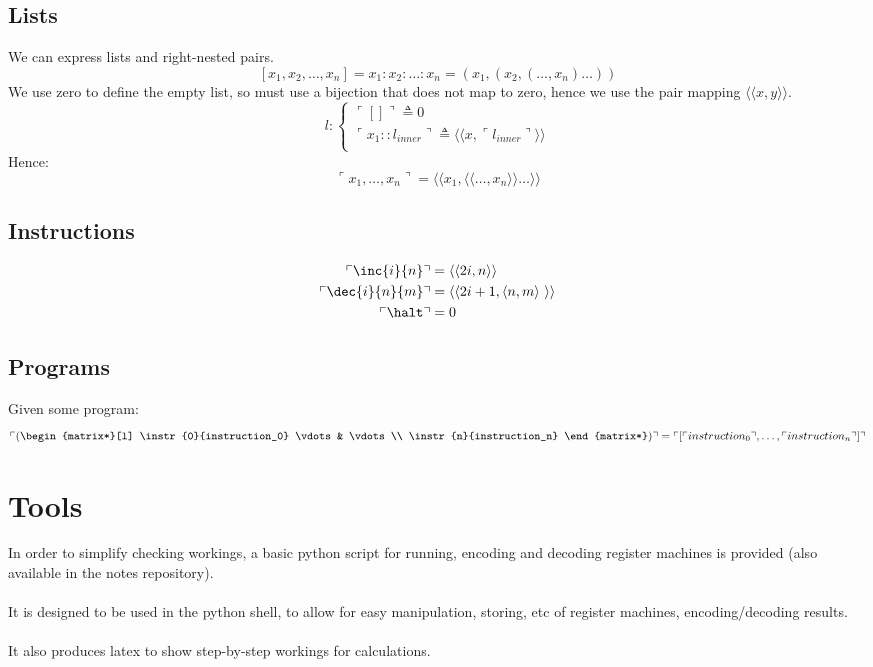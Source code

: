 \subsection{Lists}
We can express lists and right-nested pairs.
\[[x_1, x_2, \dots, x_n] = x_1:x_2:\dots:x_n = (x_1, (x_2, (\dots, x_n) \dots ))\]
We use zero to define the empty list, so must use a bijection that does not map to zero, hence we use the pair mapping $\langle\langle x,y \rangle\rangle$.
\[l : \begin{cases}
		\ulcorner [] \urcorner \triangleq 0                                                                            \\
		\ulcorner x_1 :: l_{inner} \urcorner \triangleq \langle\langle x, \ulcorner l_{inner} \urcorner \rangle\rangle \\
	\end{cases}\]
Hence:
\[\ulcorner x_1, \dots, x_n \urcorner = \langle\langle x_1 , \langle\langle \dots, x_n\rangle\rangle \dots \rangle\rangle\]
\subsection{Instructions}
\[\begin{split}
		\ulcorner \inc{i}{n} \urcorner &= \langle\langle 2i, n \rangle\rangle \\
		\ulcorner \dec{i}{n}{m} \urcorner &= \langle\langle 2i + 1, \langle n,m \rangle \  \rangle\rangle \\
		\ulcorner \halt \urcorner &= 0 \\
	\end{split}\]
\subsection{Programs}
Given some program:
\[\ulcorner \left( \begin{matrix*}[l]
			\instr{0}{instruction_0}
			\vdots & \vdots \\
			\instr{n}{instruction_n}
		\end{matrix*} \right) \urcorner = \ulcorner [\ulcorner instruction_0 \urcorner, \dots, \ulcorner instruction_n \urcorner] \urcorner\]
\section{Tools}
In order to simplify checking workings, a basic python script for running, encoding and decoding register machines is provided (also available in the notes repository).
\\
\\ It is designed to be used in the python shell, to allow for easy manipulation, storing, etc of register machines, encoding/decoding results.
\\
\\ It also produces latex to show step-by-step workings for calculations.
\inputminted{python}{register_machines/code/register_machine_encoding.py}

